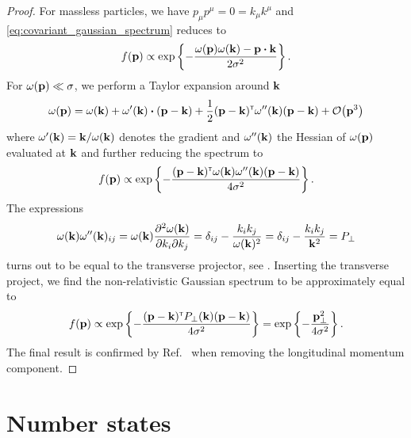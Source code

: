 \nonrelativisticgaussianmom
\begin{proof}
	For massless particles, we have $p_\mu p^\mu=0=k_\mu k^\mu$ and \cref{eq:covariant_gaussian_spectrum} reduces to
	\begin{equation*}
		f(\vb{p})
		\propto
		\exp\left\{
			-
			\frac{\omega(\vb{p})\omega(\vb{k})-\vb{p}\vdot\vb{k}}{2\sigma^2}
		\right\}
		.
	\end{equation*}
	For $\omega(\vb{p})\ll\sigma$, we perform a Taylor expansion around $\vb{k}$
	\begin{equation*}
		\omega(\vb{p})
		=
		\omega(\vb{k})
		+
		\omega^\prime(\vb{k})
		\vdot
		(\vb{p}-\vb{k})
		+
		\frac{1}{2}
		(\vb{p}-\vb{k})^\trans
		\omega^{\prime\prime}(\vb{k})
		(\vb{p}-\vb{k})
		+
		\order{\vb{p}^3}
	\end{equation*}
	where $\omega^\prime(\vb{k})=\vb{k}/\omega(\vb{k})$ denotes the gradient and $\omega^{\prime\prime}(\vb{k})$ the Hessian of $\omega(\vb{p})$ evaluated at $\vb{k}$ and further reducing the spectrum to
	\begin{equation*}
		f(\vb{p})
		\propto
		\exp\left\{
			-
			\frac{
				(\vb{p}-\vb{k})^{\scriptscriptstyle\mathsf{T}}
				\omega(\vb{k})
				\omega^{\prime\prime}(\vb{k})
				(\vb{p}-\vb{k})
			}{4\sigma^2}
		\right\}
		.
	\end{equation*}
	The expressions
	\begin{equation*}
		\omega(\vb{k})
		\omega^{\prime\prime}(\vb{k})_{ij}
		=
		\omega(\vb{k})
		\pdv{\omega(\vb{k})}{k_i}{k_j}
		=
		\delta_{ij}
		-
		\frac{k_ik_j}{\omega(\vb{k})^2}
		=
		\delta_{ij}
		-
		\frac{k_ik_j}{\vb{k}^2}
		=
		P_\perp
	\end{equation*}
	turns out to be equal to the transverse projector, see .
	Inserting the transverse project, we find the non-relativistic Gaussian spectrum to be approximately equal to
	\begin{equation*}
		f(\vb{p})
		\propto
		\exp\left\{
			-
			\frac{
				(\vb{p}-\vb{k})^{\scriptscriptstyle\mathsf{T}}
				P_\perp(\vb{k})
				(\vb{p}-\vb{k})
			}{4\sigma^2}
		\right\}
		=
		\exp\left\{
			-
			\frac{
				\vb{p}_\perp^2
			}{4\sigma^2}
		\right\}
		.
	\end{equation*}
	The final result is confirmed by Ref.~\cite[eq.~(25)]{Naumov2013} when removing the longitudinal momentum component.
\end{proof}

\section{Number states}

